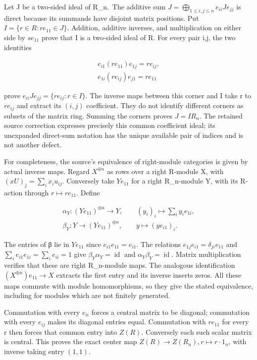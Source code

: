 \documentclass[11pt]{article}
\begin{document}
Let J be a two-sided ideal of R\_n.~The additive sum \(J=\bigoplus _{1\leq i,j\leq n} e_{ii} J e_{jj}\) is direct because its summands have disjoint matrix positions. Put \(I=\{r\in R : r e_{11}\in J\}\). Addition, additive inverses, and multiplication on either side by \(s e_{11}\) prove that I is a two-sided ideal of R. For every pair i,j, the two identities

\[\begin{gathered}
e_{i1} (r e_{11})e_{1j} = r e_{ij},\\e_{1i} (r e_{ij})e_{j1} = r e_{11}
\end{gathered}\]

prove \(e_{ii} J e_{jj}=\{r e_{ij}:r\in I\}\). The inverse maps between this corner and I take r to \(r e_{ij}\) and extract its \((i,j)\) coefficient. They do not identify different corners as subsets of the matrix ring. Summing the corners proves \(J=I R_{n}\). The retained source correction expresses precisely this common coefficient ideal; its unexpanded direct-sum notation has the unique available pair of indices and is not another defect.

For completeness, the source's equivalence of right-module categories is given by actual inverse maps. Regard \(X^{\oplus n}\) as rows over a right R-module X, with \((xU)_{j}=\sum _{i} x_{i} u_{ij}\). Conversely take \(Y e_{11}\) for a right R\_n-module Y, with its R-action through \(r\mapsto r e_{11}\). Define

\[\begin{gathered}
\alpha _{Y} : (Y e_{11})^{\oplus n} \to Y,\qquad (y_{i})_{i} \mapsto \sum _{i} y_{i} e_{1i},\\\beta _{Y} : Y \to (Y e_{11})^{\oplus n},\qquad y \mapsto (y e_{i1})_{i}.
\end{gathered}\]

The entries of β lie in \(Y e_{11}\) since \(e_{i1} e_{11}=e_{i1}\). The relations \(e_{1j} e_{i1}=\delta _{ji} e_{11}\) and \(\sum _{i} e_{i1} e_{1i}=\sum _{i} e_{ii}=1\) give \(\beta _{Y} \alpha _{Y}=\operatorname{id}\) and \(\alpha _{Y} \beta _{Y}=\operatorname{id}\). Matrix multiplication verifies that these are right R\_n-module maps. The analogous identification \((X^{\oplus n})e_{11}\to X\) extracts the first entry and its inverse inserts zeros. All these maps commute with module homomorphisms, so they give the stated equivalence, including for modules which are not finitely generated.

Commutation with every \(e_{ii}\) forces a central matrix to be diagonal; commutation with every \(e_{ij}\) makes its diagonal entries equal. Commutation with \(r e_{11}\) for every r then forces that common entry into \(Z(R)\). Conversely each such scalar matrix is central. This proves the exact center map \(Z(R)\to Z(R_{n}), r\mapsto r\cdot 1_{n}\), with inverse taking entry \((1,1)\).
\end{document}
